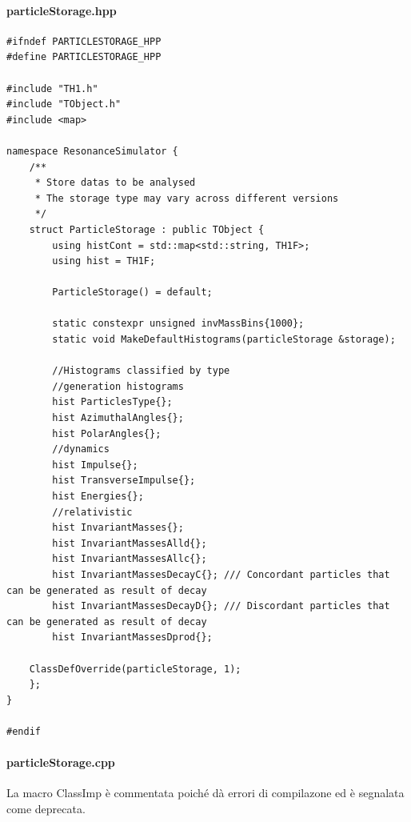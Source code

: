 \documentclass[12pt, a4paper]{article}
\begin{document}
\paragraph{particleStorage.hpp}
\begin{verbatim}
#ifndef PARTICLESTORAGE_HPP
#define PARTICLESTORAGE_HPP

#include "TH1.h"
#include "TObject.h"
#include <map>

namespace ResonanceSimulator {
    /**
     * Store datas to be analysed
     * The storage type may vary across different versions
     */
    struct ParticleStorage : public TObject {
        using histCont = std::map<std::string, TH1F>;
        using hist = TH1F;

        ParticleStorage() = default;

        static constexpr unsigned invMassBins{1000};
        static void MakeDefaultHistograms(particleStorage &storage);

        //Histograms classified by type
        //generation histograms
        hist ParticlesType{};
        hist AzimuthalAngles{};
        hist PolarAngles{};
        //dynamics
        hist Impulse{};
        hist TransverseImpulse{};
        hist Energies{};
        //relativistic
        hist InvariantMasses{};
        hist InvariantMassesAlld{};
        hist InvariantMassesAllc{};
        hist InvariantMassesDecayC{}; /// Concordant particles that can be generated as result of decay
        hist InvariantMassesDecayD{}; /// Discordant particles that can be generated as result of decay
        hist InvariantMassesDprod{};

    ClassDefOverride(particleStorage, 1);
    };
}

#endif
\end{verbatim}

\paragraph{particleStorage.cpp}
La macro ClassImp è commentata poiché dà errori di compilazone ed è segnalata come deprecata.
\end{document}
